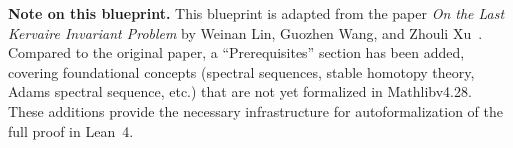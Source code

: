 \begin{abstract}
We prove that the element $h_6^2$ is a permanent cycle in the Adams spectral sequence. As a result, we establish the existence of smooth framed manifolds with Kervaire invariant one in dimension 126, thereby resolving the final case of the Kervaire invariant problem.

Combining this result with the theorems of Browder, Mahowald--Tangora, Barratt--Jones--Mahowald, and Hill--Hopkins--Ravenel, we conclude that smooth framed manifolds with Kervaire invariant one exist in and only in dimensions  $2, 6, 14, 30, 62$, and $126$.
\end{abstract}

\maketitle

\bigskip
\noindent\textbf{Note on this blueprint.}\quad
This blueprint is adapted from the paper \emph{On the Last Kervaire Invariant Problem} by Weinan Lin, Guozhen Wang, and Zhouli Xu~\cite{LWX126}.
Compared to the original paper, a ``Prerequisites'' section has been added, covering foundational concepts (spectral sequences, stable homotopy theory, Adams spectral sequence, etc.) that are not yet formalized in Mathlibv4.28.
These additions provide the necessary infrastructure for autoformalization of the full proof in Lean~4.
\bigskip
